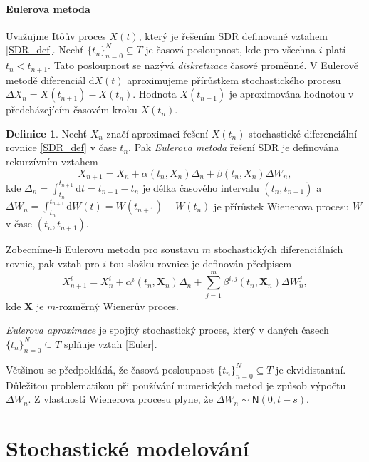 \documentclass[a4paper,12pt]{report}
\theoremstyle{definition} \newtheorem{definice}[veta]{Definice}
\theoremstyle{remark}
\begin{document}
\subsubsection{Eulerova metoda}
Uvažujme It\^oův proces $X(t)$, který je řešením SDR definované vztahem \eqref{SDR_def}.
Nechť $\{t_n\}_{n=0}^N\subseteq T$ je časová posloupnost, kde pro všechna $i$ platí $t_n<t_{n+1}$.
Tato  posloupnost se nazývá \textit{diskretizace} časové proměnné.
V Eulerově metodě diferenciál $\mathrm{d}X(t)$ aproximujeme přírůstkem stochastického procesu $\Delta X_n=X(t_{n+1})-X(t_n)$.
Hodnota $X(t_{n+1})$ je aproximována hodnotou v předcházejícím časovém kroku $X(t_{n})$.
\begin{definice}\label{Euler_def}
Nechť $X_n$ značí aproximaci řešení $X(t_{n})$ stochastické diferenciální rovnice \eqref{SDR_def} v čase $t_n$.
Pak \textit{Eulerova metoda} řešení SDR je definována rekurzívním vztahem
\begin{equation}\label{Euler}
X_{n+1}=X_n+\alpha(t_n,X_n)\Delta_n+\beta(t_n,X_n)\Delta W_n,
\end{equation}
kde $\Delta_n=\int_{t_n}^{t_{n+1}}\mathrm{d}t=t_{n+1}-t_n$ je délka časového intervalu $(t_n,t_{n+1})$
a $\Delta W_n=\int_{t_n}^{t_{n+1}}\mathrm{d}W(t)=W(t_{n+1})-W(t_n)$ je přírůstek Wienerova procesu $W$ v čase $(t_n,t_{n+1})$.

Zobecníme-li Eulerovu metodu pro soustavu $m$ stochastických diferenciálních rovnic, pak vztah pro $i$-tou složku rovnice je definován předpisem
\begin{equation}
X_{n+1}^i=X_n^i+\alpha^i(t_n,\boldsymbol{X}_n)\Delta_n+\sum_{j=1}^m\beta^{i,j}(t_n,\boldsymbol{X}_n)\Delta W_n^j,
\end{equation}
kde $\boldsymbol{X}$ je $m$-rozměrný Wienerův proces.
\end{definice}

\textit{Eulerova aproximace} je spojitý stochastický proces, který v daných časech $\{t_n\}_{n=0}^N\subseteq T$ splňuje vztah \eqref{Euler}.

Většinou se předpokládá, že časová posloupnost $\{t_n\}_{n=0}^N\subseteq T$ je ekvidistantní. 
Důležitou problematikou při používání numerických metod je způsob výpočtu $\Delta W_n$.
Z vlastnosti Wienerova procesu plyne, že $\Delta W_n\sim\mathsf{N}(0, t-s)$.


\chapter{Stochastické modelování}\label{stoch_model}
\end{document}
